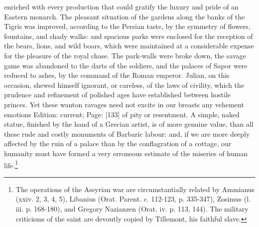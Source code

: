 enriched with every production that could gratify the luxury and pride of an Eastern monarch. The pleasant situation of the gardens along the banks of the Tigris was improved, according to the Persian taste, by the symmetry of flowers, fountains, and shady walks: and spacious parks were enclosed for the reception of the bears, lions, and wild boars, which were maintained at a considerable expense for the pleasure of the royal chase. The park-walls were broke down, the savage game was abandoned to the darts of the soldiers, and the palaces of Sapor were reduced to ashes, by the command of the Roman emperor. Julian, on this occasion, shewed himself ignorant, or careless, of the laws of civility, which the prudence and refinement of polished ages have established between hostile princes. Yet these wanton ravages need not excite in our breasts any vehement emotions Edition: current; Page: [133] of pity or resentment. A simple, naked statue, finished by the hand of a Grecian artist, is of more genuine value, than all these rude and costly monuments of Barbaric labour: and, if we are more deeply affected by the ruin of a palace than by the conflagration of a cottage, our humanity must have formed a very erroneous estimate of the miseries of human life.\footnote{The operations of the Assyrian war are circumstantially related by Ammianus (xxiv. 2, 3, 4, 5), Libanius (Orat. Parent. c. 112-123, p. 335-347), Zosimus (l. iii. p. 168-180), and Gregory Nazianzen (Orat. iv. p. 113, 144). The military criticisms of the saint are devoutly copied by Tillemont, his faithful slave.}

